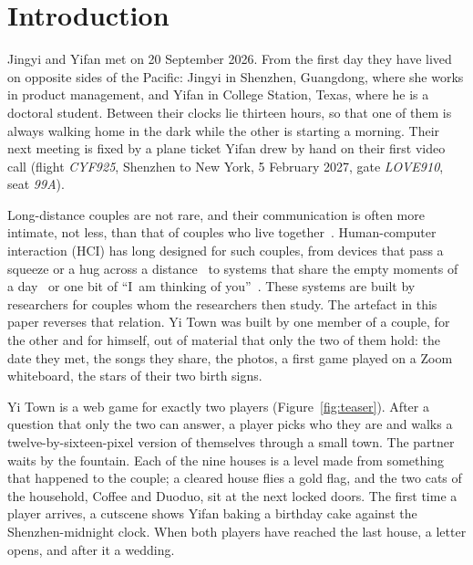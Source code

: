 \documentclass[sigconf,nonacm]{acmart}
\newcommand{\yt}{Yi Town}
\begin{document}
\section{Introduction}

Jingyi and Yifan met on 20 September 2026. From the first day they have lived on opposite
sides of the Pacific: Jingyi in Shenzhen, Guangdong, where she works in product management, and
Yifan in College Station, Texas, where he is a doctoral student. Between their
clocks lie thirteen hours, so that one of them is always walking home in the dark while the other
is starting a morning. Their next meeting is fixed by a plane ticket Yifan drew by hand on their
first video call (flight \emph{CYF925}, Shenzhen to New York, 5 February 2027, gate
\emph{LOVE910}, seat \emph{99A}).

Long-distance couples are not rare, and their communication is often more intimate, not less,
than that of couples who live together~\cite{jiang2013absence,stafford2005maintaining}. Human-computer
interaction (HCI) has long designed for such couples, from devices that pass a squeeze or a hug
across a distance~\cite{brave1997intouch,mueller2005hug,strong1996feather} to systems that share
the empty moments of a day~\cite{lottridge2009sharing,tsujita2008syncdecor} or one bit of
``I~am thinking of you''~\cite{kaye2006clicked}. These systems are built by researchers for couples
whom the researchers then study. The artefact in this paper reverses that relation. \yt{} was
built by one member of a couple, for the other and for himself, out of material that only the two
of them hold: the date they met, the songs they share, the photos, a first game played on a Zoom
whiteboard, the stars of their two birth signs.

\yt{} is a web game for exactly two players (Figure~\ref{fig:teaser}). After a question that
only the two can answer, a player picks who they are and walks a twelve-by-sixteen-pixel version
of themselves through a small town. The partner waits by the fountain. Each of the nine houses is
a level made from something that happened to the couple; a cleared house flies a gold flag, and the
two cats of the household, Coffee and Duoduo, sit at the next locked doors. The first time a player
arrives, a cutscene shows Yifan baking a birthday cake against the Shenzhen-midnight clock. When
both players have reached the last house, a letter opens, and after it a wedding.
\end{document}
